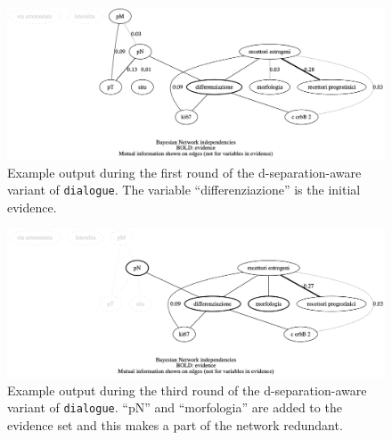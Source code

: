\begin{figure}[htbp]
\centerline{\includegraphics[width=\textwidth]{methodology/images/example-d-separation-mpe_1}}
\caption{Example output during the first round of the d-separation-aware variant of \texttt{dialogue}.
	The variable \enquote{differenziazione} is the initial evidence.}
\label{fig:pseudo-mpe-independencies_1}
\end{figure}

\begin{figure}[htbp]
\centerline{\includegraphics[width=\textwidth]{methodology/images/example-d-separation-mpe_2}}
\caption{Example output during the third round of the d-separation-aware variant of \texttt{dialogue}.
	\enquote{pN} and \enquote{morfologia} are added to the evidence set and this makes a part of the network redundant.}
\label{fig:pseudo-mpe-independencies_2}
\end{figure}

